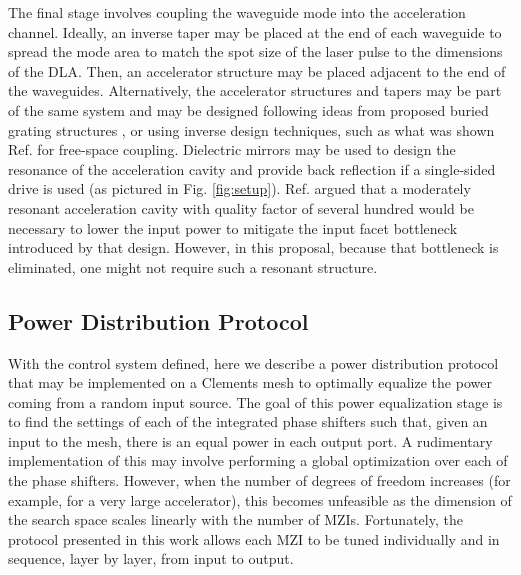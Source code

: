 The final stage involves coupling the waveguide mode into the acceleration channel.  Ideally, an inverse taper may be placed at the end of each waveguide to spread the mode area to match the spot size of the laser pulse to the dimensions of the DLA.  Then, an accelerator structure may be placed adjacent to the end of the waveguides.  Alternatively, the accelerator structures and tapers may be part of the same system and may be designed following ideas from proposed buried grating structures \cite{chang_silicon_2014}, or using inverse design techniques, such as what was shown Ref. \cite{hughes_method_2017} for free-space coupling.  Dielectric mirrors may be used to design the resonance of the acceleration cavity and provide back reflection if a single-sided drive is used \cite{yousefi2019dielectric} (as pictured in Fig. \ref{fig:setup}).  Ref. \cite{hughes_-chip_2018} argued that a moderately resonant acceleration cavity with quality factor of several hundred would be necessary to lower the input power to mitigate the input facet bottleneck introduced by that design.  However, in this proposal, because that bottleneck is eliminated, one might not require such a resonant structure.

\subsection{\label{sec:algo}Power Distribution Protocol}

With the control system defined, here we describe a power distribution protocol that may be implemented on a Clements mesh to optimally equalize the power coming from a random input source.  The goal of this power equalization stage is to find the settings of each of the integrated phase shifters such that, given an input to the mesh, there is an equal power in each output port.  A rudimentary implementation of this may involve performing a global optimization over each of the phase shifters.  However, when the number of degrees of freedom increases (for example, for a very large accelerator), this becomes unfeasible as the dimension of the search space scales linearly with the number of MZIs. Fortunately, the protocol presented in this work allows each MZI to be tuned individually and in sequence, layer by layer, from input to output.

